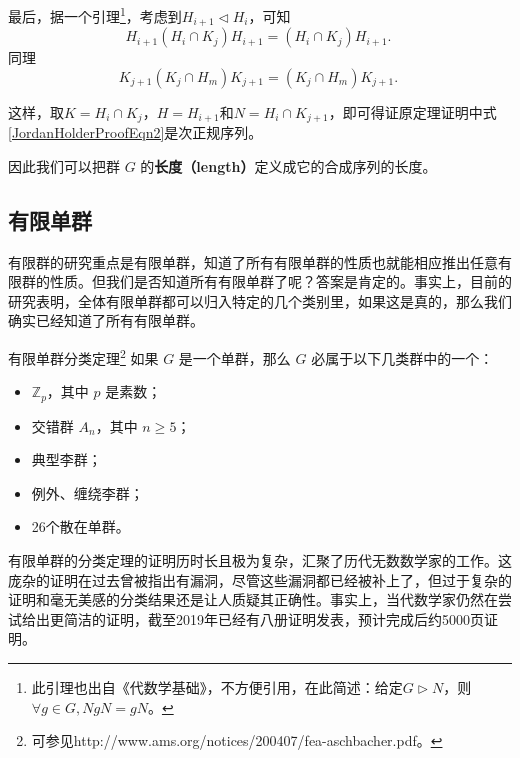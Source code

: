 最后，据一个引理\footnote{此引理也出自《代数学基础》，不方便引用，在此简述：给定$G\rhd N$，则$\forall g\in G, NgN=gN$。}，考虑到$H_{i+1}\lhd H_i$，可知
\begin{equation}
H_{i+1}(H_i\cap K_j)H_{i+1}=(H_i\cap K_j)H_{i+1}. ~
\end{equation}
同理
\begin{equation}
    K_{j+1}(K_j\cap H_m)K_{j+1} = (K_j\cap H_m)K_{j+1}. ~
\end{equation}

这样，取$K=H_i\cap K_j$，$H=H_{i+1}$和$N=H_i\cap K_{j+1}$，即可得证原定理证明中式\ref{JordanHolderProofEqn2}是次正规序列。










因此我们可以把群 $G$ 的\textbf{长度（length）}定义成它的合成序列的长度。

\subsection{有限单群}

有限群的研究重点是有限单群，知道了所有有限单群的性质也就能相应推出任意有限群的性质。但我们是否知道所有有限单群了呢？答案是肯定的。事实上，目前的研究表明，全体有限单群都可以归入特定的几个类别里，如果这是真的，那么我们确实已经知道了所有有限单群。

\begin{definition}{有限单群分类定理\footnote{可参见http://www.ams.org/notices/200407/fea-aschbacher.pdf。}}
如果 $G$ 是一个单群，那么 $G$ 必属于以下几类群中的一个：
\begin{itemize}
\item $\mathbb{Z}_p$，其中 $p$ 是素数；
\item 交错群 $A_n$，其中 $n\geq 5$；
\item 典型李群；
\item 例外、缠绕李群；
\item 26个散在单群。
\end{itemize}
\end{definition}

有限单群的分类定理的证明历时长且极为复杂，汇聚了历代无数数学家的工作。这庞杂的证明在过去曾被指出有漏洞，尽管这些漏洞都已经被补上了，但过于复杂的证明和毫无美感的分类结果还是让人质疑其正确性。事实上，当代数学家仍然在尝试给出更简洁的证明，截至2019年已经有八册证明发表，预计完成后约5000页证明。












